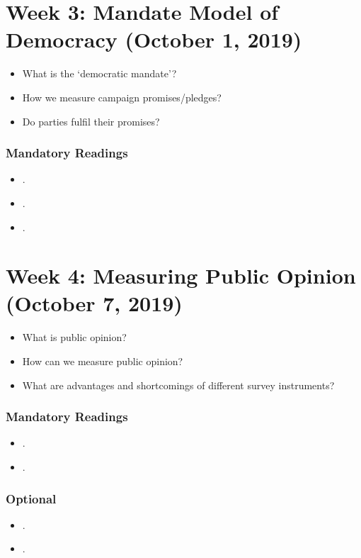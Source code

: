 \documentclass[abstract=on,parskip=full,headings=standardclasses,fontsize=11pt,paper=a4]{scrartcl}
\begin{document}
\section{Week 3:  Mandate Model of Democracy (October 1, 2019)}



\begin{itemize}
\renewcommand\labelitemi{--}
\item What is the `democratic mandate'? 
\item How we measure campaign promises/pledges?
\item Do parties fulfil their promises?
\end{itemize}

\subsubsection*{Mandatory Readings}
\begin{itemize}
\item {}.
\item {}.
\item {}.
\end{itemize}


\section{Week 4: Measuring Public Opinion (October 7, 2019)}


\begin{itemize}
\renewcommand\labelitemi{--}
\item What is public opinion?
\item How can we measure public opinion? 
\item What are advantages and shortcomings of different survey instruments?
\end{itemize}


\subsubsection*{Mandatory Readings}
\begin{itemize}
\item {}.
\item {}.
\end{itemize}


\subsubsection*{Optional}
\begin{itemize}
\item {}.
\item {}.
\end{itemize}
\end{document}
